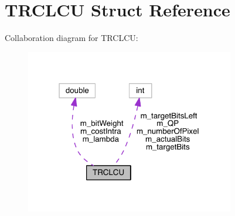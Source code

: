 \hypertarget{struct_t_r_c_l_c_u}{}\section{T\+R\+C\+L\+CU Struct Reference}
\label{struct_t_r_c_l_c_u}


Collaboration diagram for T\+R\+C\+L\+CU\+:
\nopagebreak
\begin{figure}[H]
\begin{center}
\leavevmode
\includegraphics[width=259pt]{d7/d62/struct_t_r_c_l_c_u__coll__graph}
\end{center}
\end{figure}
